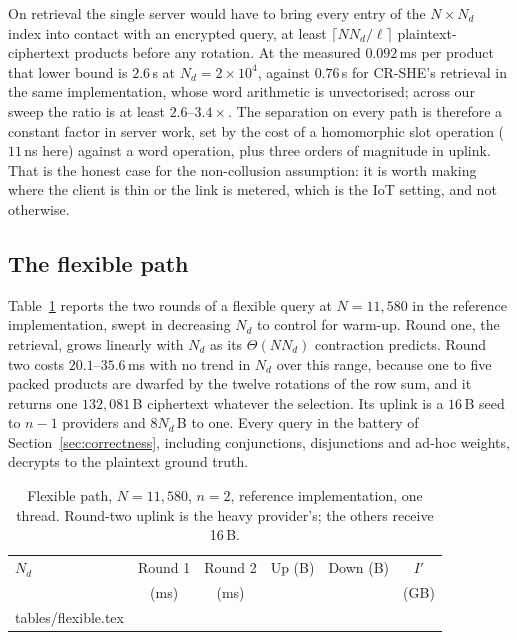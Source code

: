 \documentclass[a4paper,fleqn]{cas-dc}
\begin{document}
On retrieval the single server would have to bring every entry of the
$N\times N_d$ index into contact with an encrypted query, at least
$\lceil NN_d/\ell\rceil$ plaintext-ciphertext products before any rotation.
At the measured $0.092$\,ms per product that lower bound is $2.6$\,s at
$N_d=2\times10^4$, against $0.76$\,s for CR-SHE's retrieval in the same
implementation, whose word arithmetic is unvectorised; across our sweep the
ratio is at least $2.6$--$3.4\times$. The separation on every path is therefore
a constant factor in server work, set by the cost of a homomorphic slot
operation ($11$\,ns here) against a word operation, plus three orders of
magnitude in uplink. That is the honest case for the non-collusion assumption:
it is worth making where the client is thin or the link is metered, which is
the IoT setting, and not otherwise.

\subsection{The flexible path}
\label{sec:flexresult}
Table~\ref{tab:flex} reports the two rounds of a flexible query at
$N=11{,}580$ in the reference implementation, swept in decreasing $N_d$ to
control for warm-up. Round one, the retrieval, grows linearly with $N_d$ as
its $\Theta(NN_d)$ contraction predicts. Round two costs $20.1$--$35.6$\,ms
with no trend in $N_d$ over this range, because one to five packed products are
dwarfed by the twelve rotations of the row sum, and it returns one
$132{,}081$\,B ciphertext whatever the selection. Its uplink is a $16$\,B seed
to $n-1$ providers and $8N_d$\,B to one. Every query in the battery of
Section~\ref{sec:correctness}, including conjunctions, disjunctions and ad-hoc
weights, decrypts to the plaintext ground truth.

\begin{table}[pos=t]
\caption{Flexible path, $N=11{,}580$, $n=2$, reference implementation, one
thread. Round-two uplink is the heavy provider's; the others receive 16\,B.}
\label{tab:flex}
\centering
\footnotesize
\setlength{\tabcolsep}{2pt}
\begin{tabular*}{\tblwidth}{@{\extracolsep{\fill}}lccccc@{}}
\toprule
$N_d$ & Round 1 & Round 2 & Up (B) & Down (B) & $I'$ \\
      & (ms)    & (ms)    &        &          & (GB) \\
\midrule
{} tables/flexible.tex 
\bottomrule
\end{tabular*}
\end{table}
\end{document}
